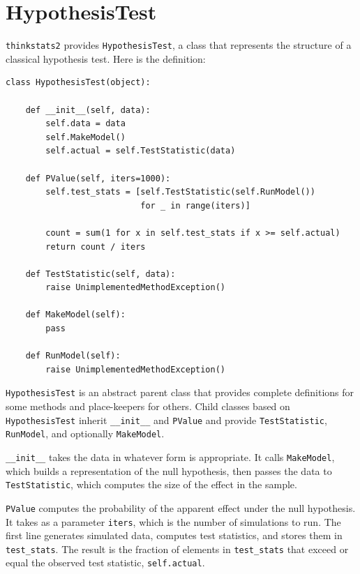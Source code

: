 \documentclass[12pt]{book}
\begin{document}
\section{HypothesisTest}
\label{hypotest}

\verb"thinkstats2" provides \verb"HypothesisTest", a
class that represents the structure of a classical hypothesis
test.  Here is the definition:

\begin{verbatim}
class HypothesisTest(object):

    def __init__(self, data):
        self.data = data
        self.MakeModel()
        self.actual = self.TestStatistic(data)

    def PValue(self, iters=1000):
        self.test_stats = [self.TestStatistic(self.RunModel()) 
                           for _ in range(iters)]

        count = sum(1 for x in self.test_stats if x >= self.actual)
        return count / iters

    def TestStatistic(self, data):
        raise UnimplementedMethodException()

    def MakeModel(self):
        pass

    def RunModel(self):
        raise UnimplementedMethodException()
\end{verbatim}

\verb"HypothesisTest" is an abstract parent class that provides
complete definitions for some methods and place-keepers for others.
Child classes based on \verb"HypothesisTest" inherit \verb"__init__"
and \verb"PValue" and provide \verb"TestStatistic",
\verb"RunModel", and optionally \verb"MakeModel".

\verb"__init__" takes the data in whatever form is appropriate.  It
calls \verb"MakeModel", which builds a representation of the null
hypothesis, then passes the data to \verb"TestStatistic", which
computes the size of the effect in the sample.

\verb"PValue" computes the probability of the apparent effect under
the null hypothesis.  It takes as a parameter \verb"iters", which is
the number of simulations to run.  The first line generates simulated
data, computes test statistics, and stores them in
\verb"test_stats".
The result is
the fraction of elements in \verb"test_stats" that
exceed or equal the observed test statistic, \verb"self.actual".
\end{document}
